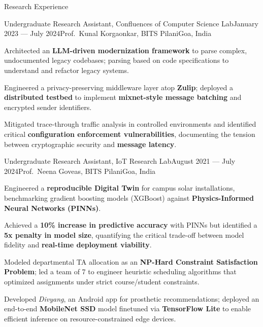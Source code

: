 
\begin{rSection}{Research Experience}

    \begin{rSubsection}{Undergraduate Research Assistant, Confluences of Computer Science Lab}{January 2023 --- July 2024}{Prof.\ Kunal Korgaonkar, BITS Pilani}{Goa, India}
        \item Architected an \textbf{LLM-driven modernization framework} to parse complex, undocumented legacy codebases; parsing based on code specifications to understand and refactor legacy systems.
        \item Engineered a privacy-preserving middleware layer atop \textbf{Zulip}; deployed a \textbf{distributed testbed} to implement \textbf{mixnet-style message batching} and encrypted sender identifiers.
        \item Mitigated trace-through traffic analysis in controlled environments and identified critical \textbf{configuration enforcement vulnerabilities}, documenting the tension between cryptographic security and \textbf{message latency}.
    \end{rSubsection}

    \begin{rSubsection}{Undergraduate Research Assistant, IoT Research Lab}{August 2021 --- July 2024}{Prof.\ Neena Goveas, BITS Pilani}{Goa, India}
        \item Engineered a \textbf{reproducible Digital Twin} for campus solar installations, benchmarking gradient boosting models (XGBoost) against \textbf{Physics-Informed Neural Networks (PINNs)}.
        \item Achieved a \textbf{10\% increase in predictive accuracy} with PINNs but identified a \textbf{5x penalty in model size}, quantifying the critical trade-off between model fidelity and \textbf{real-time deployment viability}.
        \item Modeled departmental TA allocation as an \textbf{NP-Hard Constraint Satisfaction Problem}; led a team of 7 to engineer heuristic scheduling algorithms that optimized assignments under strict course/student constraints.
        \item Developed \textit{Divyang}, an Android app for prosthetic recommendations; deployed an end-to-end \textbf{MobileNet SSD} model finetuned via \textbf{TensorFlow Lite} to enable efficient inference on resource-constrained edge devices.
    \end{rSubsection}

\end{rSection}